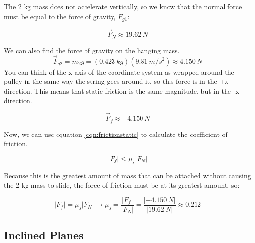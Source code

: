 \begin{mdframed}[backgroundcolor=blue!10!white]
		The 2 kg mass does not accelerate vertically, so we know that the normal force must be equal to the force of gravity, $F_{g1}$:
		
		\begin{equation*}
			\vec{F}_N \approx \SI{19.62}{N}
		\end{equation*}
		
		We can also find the force of gravity on the hanging mass.  
			\begin{equation*}
			\vec{F}_{g2} = m_2 g = (\SI{0.423}{kg})(\SI{9.81}{m/s^2}) \approx \SI{4.150}{N}
		\end{equation*}
		You can think of the x-axis of the coordinate system as wrapped around the pulley in the same way the string goes around it, so this force is in the +x direction.  This means that static friction is the same magnitude, but in the -x direction.
		
			\begin{equation*}
			\vec{F}_f \approx \SI{-4.150}{N}
		\end{equation*}
		 
		 Now, we can use equation \ref{eqn:frictionstatic} to calculate the coefficient of friction.  
		 
		 	\begin{equation*}
		 	|F_f| \leq \mu_s |F_N|  
		 \end{equation*}
		 
		 Because this is the greatest amount of mass that can be attached without causing the 2 kg mass to slide, the force of friction must be at its greatest amount, so:
		 
		 \begin{equation*}
		 	|F_f| = \mu_s |F_N|  \longrightarrow \mu_s = \frac{|F_f|}{|F_N|} = \frac{|\SI{-4.150}{N}|}{|\SI{19.62}{N}|} \approx 0.212
		 \end{equation*}
		 
		
	\end{mdframed}	
	
	
	\newpage
		
		\subsection{Inclined Planes}
		
